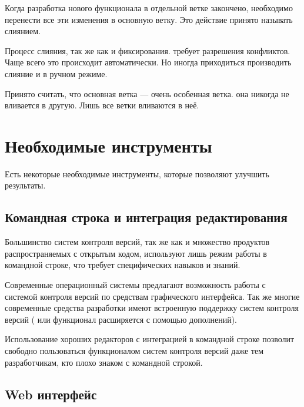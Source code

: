   Когда разработка нового функционала в отдельной ветке закончено, необходимо перенести все эти изменения в основную ветку. Это действие принято называть слиянием.
  
 
 Процесс слияния, так же как и фиксирования. требует  разрешения конфликтов. Чаще всего это происходит автоматически. Но иногда приходиться производить слияние и в ручном режиме.

Принято считать, что основная ветка --- очень особенная ветка. она никогда не вливается в другую. Лишь все ветки вливаются в неё.


\section{ Необходимые инструменты} \label{sect3_3}

Есть некоторые необходимые инструменты, которые позволяют улучшить результаты.

\subsection{ Командная строка и интеграция редактирования } \label{sect3_3_1}

Большинство систем контроля версий, так же как и множество продуктов распространяемых с открытым кодом, используют лишь режим работы в командной строке, что требует специфических навыков и знаний.

Современные операционный системы предлагают возможность работы с системой контроля версий по средствам графического интерфейса. Так же многие современные средства разработки имеют встроенную поддержку систем контроля версий ( или функционал расширяется с помощью дополнений).

Использование хороших редакторов  с интеграцией в командной строке позволит свободно пользоваться функционалом систем контроля версий даже тем разработчикам, кто плохо знаком с командной строкой.

\subsection{ Web интерфейс } \label{sect3_3_2}































\clearpage


